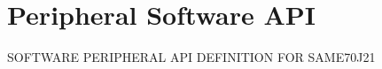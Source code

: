 \hypertarget{group__SAME70J21__api}{}\section{Peripheral Software A\+PI}
\label{group__SAME70J21__api}
S\+O\+F\+T\+W\+A\+RE P\+E\+R\+I\+P\+H\+E\+R\+AL A\+PI D\+E\+F\+I\+N\+I\+T\+I\+ON F\+OR S\+A\+M\+E70\+J21 